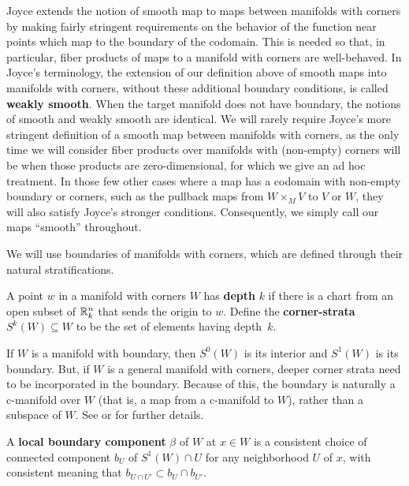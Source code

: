 Joyce extends the notion of smooth map to maps between manifolds with corners by making fairly stringent requirements on the behavior of the function near points which map to the boundary of the codomain.
This is needed so that, in particular, fiber products of maps to a manifold with corners are well-behaved.
In Joyce's terminology, the extension of our definition above of smooth maps into manifolds with corners, without these additional boundary conditions, is called {\bf weakly smooth}.
When the target manifold does not have boundary, the notions of smooth and weakly smooth are identical.
We will rarely require Joyce's more stringent definition of a smooth map between manifolds with corners, as the only time we will consider fiber products over manifolds with (non-empty) corners will be when those products are zero-dimensional, for which we give an ad hoc treatment.
In those few other cases where a map has a codomain with non-empty boundary or corners, such as the pullback maps from $W \times_M V$ to $V$ or $W$, they will also satisfy Joyce's stronger conditions.
Consequently, we simply call our maps ``smooth'' throughout.

We will use boundaries of manifolds with corners, which are defined through their natural stratifications.

\begin{definition}
	A point $w$ in a manifold with corners $W$ has \textbf{depth} $k$ if there is a chart from an open subset of $\mathbb{R}^n_k$ that sends the origin to $w$.
	Define the {\bf corner-strata} $S^k(W) \subseteq W$ to be the set of elements having depth~$k$.
\end{definition}

If $W$ is a manifold with boundary, then $S^0(W)$ is its interior and $S^1(W)$ is its boundary.
But, if $W$ is a general manifold with corners, deeper corner strata need to be incorporated in the boundary.
Because of this, the boundary is naturally a c-manifold over $W$ (that is, a map from a c-manifold to $W$), rather than a subspace of $W$.
See \cite[Section 2]{Joy12} or \cite[Section 2.1]{medina2022foundations} for further details.

\begin{definition}
	A \textbf{local boundary component} $\beta$ of $W$ at $x \in W$ is a consistent choice of connected component $b_U$ of $S^1(W) \cap U$ for any neighborhood $U$ of $x$, with consistent meaning that $b_{U \cap U'} \subset b_{U} \cap b_{U'}$.
\end{definition}

